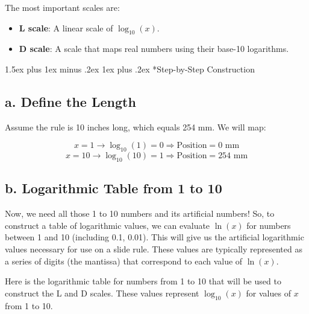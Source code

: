 \documentclass[10pt,twocolumn]{article}
\makeatletter
\renewcommand\section{%
  \@startsection{section}{1}{0pt}%
  {1.5ex plus 1ex minus .2ex}%
  {1ex plus .2ex}%
  {\normalfont\normalsize\bfseries}} %
\makeatother
\begin{document}
The most important scales are:

\begin{itemize}
  \item \textbf{L scale}: A linear scale of $\log_{10}(x)$.
  \item \textbf{D scale}: A scale that maps real numbers using their base-10 logarithms.
\end{itemize}

\section*{Step-by-Step Construction}

\subsection*{a. Define the Length}

Assume the rule is 10 inches long, which equals 254 mm. We will map:

\[
x = 1 \rightarrow \log_{10}(1) = 0 \Rightarrow \text{Position} = 0 \text{ mm}
\]
\[
x = 10 \rightarrow \log_{10}(10) = 1 \Rightarrow \text{Position} = 254 \text{ mm}
\]

\subsection*{b. Logarithmic Table from 1 to 10}

Now, we need all those 1 to 10 numbers and its artificial numbers! So, to construct a table of logarithmic values, we can evaluate \( \ln(x) \) for numbers between 1 and 10 (including 0.1, 0.01). This will give us the artificial logarithmic values necessary for use on a slide rule. These values are typically represented as a series of digits (the mantissa) that correspond to each value of \( \ln(x) \).

Here is the logarithmic table for numbers from 1 to 10 that will be used to construct the L and D scales. 
These values represent $\log_{10}(x)$ for values of \( x \) from 1 to 10.
\end{document}
